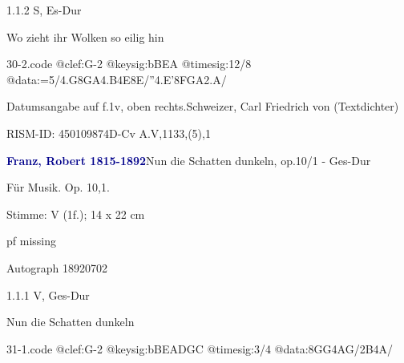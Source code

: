 \documentclass[a4paper, twocolumn, 11pt]{book}
\begin{document}
\newline %
\par 1.1.2  S, Es-Dur\newline \begin{footnotesize} Wo zieht ihr Wolken so eilig hin \end{footnotesize}  
\begin{filecontents*}{30-2.code}
@clef:G-2
@keysig:bBEA
@timesig:12/8
@data:=5/4.G{8GA}4.B4E8E/''4.E'{8FGA}2.A/
\end{filecontents*}
\newline %
\par Datumsangabe auf f.1v, oben rechts.\newline Schweizer, Carl Friedrich von  (Textdichter)
\par RISM-ID: 450109874\newline D-Cv  A.V,1133,(5),1
\par \vspace{16pt} \textcolor{darkblue}{\textbf{Franz, Robert  1815-1892}}\hfillplus{[31]}\newline Nun die Schatten dunkeln, op.10/1 - Ges-Dur
\par \begin{itshape} Für Musik. Op. 10,1.\end{itshape} 
\par \textcolor{darkblue}{}  Stimme: V  (1f.); 14 x 22 cm\newline \begin{small} pf missing\end{small} \newline Autograph  18920702
\par 1.1.1  V, Ges-Dur\newline \begin{footnotesize} Nun die Schatten dunkeln \end{footnotesize}  
\begin{filecontents*}{31-1.code}
@clef:G-2
@keysig:bBEADGC
@timesig:3/4
@data:8GG4AG/2B4A/
\end{filecontents*}
\end{document}
